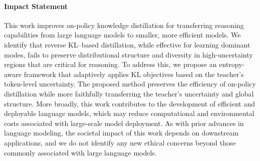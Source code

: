 \documentclass{article}
\theoremstyle{plain}
\theoremstyle{definition}
\theoremstyle{remark}
\newcommand{\methodfullname}{Entropy-Aware On-Policy Distillation}
\begin{document}
\begin{abstract}
\end{abstract}








%


\paragraph{Impact Statement}
This work improves on-policy knowledge distillation for transferring reasoning capabilities from large language models to smaller, more efficient models. We identify that reverse KL–based distillation, while effective for learning dominant modes, fails to preserve distributional structure and diversity in high-uncertainty regions that are critical for reasoning. To address this, we propose an entropy-aware framework that adaptively applies KL objectives based on the teacher’s token-level uncertainty. The proposed method preserves the efficiency of on-policy distillation while more faithfully transferring the teacher’s uncertainty and global structure. More broadly, this work contributes to the development of efficient and deployable language models, which may reduce computational and environmental costs associated with large-scale model deployment. As with prior advances in language modeling, the societal impact of this work depends on downstream applications, and we do not identify any new ethical concerns beyond those commonly associated with large language models.


\end{document}
